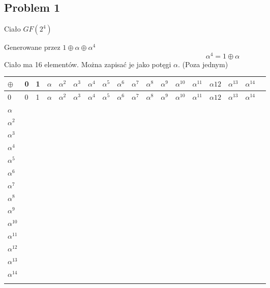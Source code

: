 \documentclass[12pt]{article}
\begin{document}
\subsection*{Problem 1}
Ciało $GF(2^4)$

Generowane przez $1 \oplus \alpha \oplus \alpha^4$
$$\alpha^4 = 1 \oplus \alpha $$
Ciało ma 16 elementów. Można zapisać je jako potęgi $\alpha$. (Poza jednym) 

\begin{table}[h]
    \begin{tabular}{l|lllllllllllllllll}
        $\oplus   $  & 0 & 1 & $\alpha $  & $\alpha ^2 $ & $\alpha ^3 $ &$\alpha ^4 $  &$\alpha^5 $  & $\alpha ^6$ & $\alpha ^7 $ & $\alpha ^8 $ &  $\alpha^9 $& $\alpha ^{10} $ & $\alpha^{11} $ & $\alpha {12} $ & $\alpha ^{13}  $ & $\alpha ^{14}$ \\ \hline
        $0        $  & 0 & 1 & $\alpha $  & $\alpha ^2 $ & $\alpha ^3 $ &$\alpha ^4 $  &$\alpha^5 $  & $\alpha ^6$ & $\alpha ^7 $ & $\alpha ^8 $ &  $\alpha^9 $& $\alpha ^{10} $ & $\alpha^{11} $ & $\alpha {12} $ & $\alpha ^{13}  $ & $\alpha ^{14}$ \\
        $\alpha   $  &  &  &  &  &  &  &  &  &  &  &  &  &  &  &  &  \\
        $\alpha ^2$  &  &  &  &  &  &  &  &  &  &  &  &  &  &  &  &  \\
        $\alpha ^3$  &  &  &  &  &  &  &  &  &  &  &  &  &  &  &  &  \\
        $\alpha ^4$  &  &  &  &  &  &  &  &  &  &  &  &  &  &  &  &  \\
        $\alpha ^5$  &  &  &  &  &  &  &  &  &  &  &  &  &  &  &  &  \\
        $\alpha ^6$  &  &  &  &  &  &  &  &  &  &  &  &  &  &  &  &  \\
        $\alpha ^7$  &  &  &  &  &  &  &  &  &  &  &  &  &  &  &  &  \\
        $\alpha ^8$  &  &  &  &  &  &  &  &  &  &  &  &  &  &  &  &  \\
        $\alpha ^9$  &  &  &  &  &  &  &  &  &  &  &  &  &  &  &  &  \\
        $\alpha ^{10}$ &  &  &  &  &  &  &  &  &  &  &  &  &  &  &  &  \\
        $\alpha ^{11}$ &  &  &  &  &  &  &  &  &  &  &  &  &  &  &  &  \\
        $\alpha ^{12}$ &  &  &  &  &  &  &  &  &  &  &  &  &  &  &  &  \\
        $\alpha ^{13}$ &  &  &  &  &  &  &  &  &  &  &  &  &  &  &  &  \\
        $\alpha ^{14}$ &  &  &  &  &  &  &  &  &  &  &  &  &  &  &  &  \\
        &  &  &  &  &  &  &  &  &  &  &  &  &  &  &  & 
    \end{tabular}
\end{table}
\end{document}
